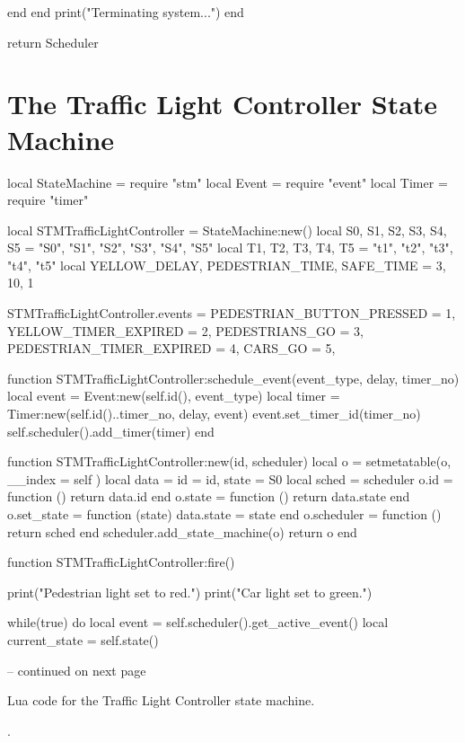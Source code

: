 \begin{appendices}
\begin{listing}[htp]
\begin{luacode}
		end
	end
	print("Terminating system...")
end

return Scheduler
\end{luacode}
\end{listing}

\FloatBarrier
\section{The Traffic Light Controller State Machine}
\label{sec:traffic_light_stm}

\begin{listing}[htp]
\begin{luacode}
local StateMachine = require "stm"
local Event = require "event"
local Timer = require "timer"

local STMTrafficLightController = StateMachine:new()
local S0, S1, S2, S3, S4, S5 = "S0", "S1", "S2", "S3", "S4", "S5"
local T1, T2, T3, T4, T5 = "t1", "t2", "t3", "t4", "t5"
local YELLOW_DELAY, PEDESTRIAN_TIME, SAFE_TIME = 3, 10, 1

STMTrafficLightController.events = {
	PEDESTRIAN_BUTTON_PRESSED = 1,
	YELLOW_TIMER_EXPIRED = 2,
	PEDESTRIANS_GO = 3,
	PEDESTRIAN_TIMER_EXPIRED = 4,
	CARS_GO = 5,
}

function STMTrafficLightController:schedule_event(event_type, delay, timer_no)
	local event = Event:new(self.id(), event_type)
	local timer = Timer:new(self.id()..timer_no, delay, event)
	event.set_timer_id(timer_no)
	self.scheduler().add_timer(timer)
end

function STMTrafficLightController:new(id, scheduler)
	local o = {}
	setmetatable(o, { __index = self })
	local data = {id = id, state = S0}
	local sched = scheduler
	o.id = function ()
		return data.id
	end
	o.state = function ()
		return data.state
	end
	o.set_state = function (state)
		data.state = state
	end
	o.scheduler = function ()
		return sched
	end
	scheduler.add_state_machine(o)
	return o
end

function STMTrafficLightController:fire()

	print("Pedestrian light set to red.")
	print("Car light set to green.")

	while(true) do
		local event = self.scheduler().get_active_event()
		local current_state = self.state()
		
-- continued on next page
\end{luacode}
	\caption{Lua code for the Traffic Light Controller state machine.}.
	\label{code:traffic_light}
\end{listing}


\end{appendices}
